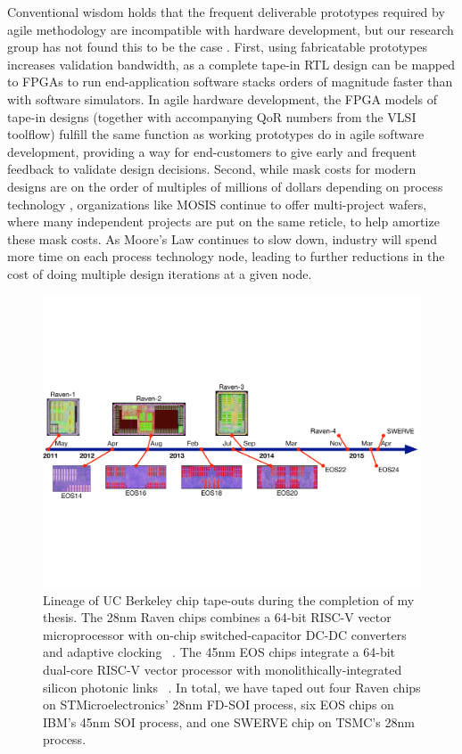 Conventional wisdom holds that the frequent deliverable prototypes required by agile methodology are incompatible with hardware development, but our research group has not found this to be the case \cite{lee-micro15}.
First, using fabricatable prototypes increases validation
bandwidth, as a complete tape-in RTL design can be mapped to FPGAs to run
end-application software stacks orders of magnitude faster than with
software simulators. 
In agile hardware development, the FPGA models
of tape-in designs (together with accompanying QoR
numbers from the VLSI toolflow) fulfill the same function as working
prototypes do in agile software development, providing a way for
end-customers to give early and frequent feedback to validate design decisions.
Second, while mask costs for modern designs are on the order of multiples of millions of dollars depending on process technology \cite{sperling}, 
organizations like MOSIS continue to offer multi-project wafers, where many independent projects are put on the same reticle, to help amortize these mask costs.
As Moore's Law continues to slow down, industry will spend more time on each process technology node, leading to further reductions in the cost of doing multiple design iterations
at a given node.

\begin{figure}[t!]
\centering
\includegraphics[width=\columnwidth]{intro/figures/tapeouts.pdf}
\caption[Lineage of UC Berkeley chip tape-outs.]{Lineage of UC Berkeley chip tape-outs during the completion of my thesis.
The 28nm Raven chips combines a 64-bit RISC-V vector microprocessor with on-chip switched-capacitor DC-DC converters and adaptive clocking ~\cite{zimmer2015raven}.
The 45nm EOS chips integrate a 64-bit dual-core RISC-V vector processor with monolithically-integrated silicon photonic links ~\cite{lee2014eos}.
In total, we have taped out
four Raven chips on STMicroelectronics' 28nm FD-SOI process,
six EOS chips on IBM's 45nm SOI process,
and one SWERVE chip on TSMC's 28nm process. 
}
\label{fig:tapeouts}
\end{figure}


